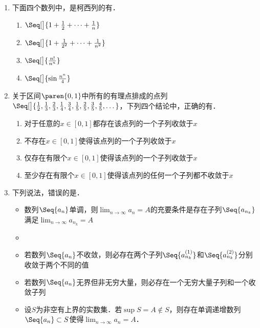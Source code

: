 \begin{enumerate}
\item 下面四个数列中，是柯西列的有\uline{}．
  \begin{enumerate}
    \renewcommand{\labelenumii}{\enumparen{\arabic{enumii}}}
  \item \(\Seq[\big]{1 + \frac12 + \dots + \frac1n}\)
  \item \(\Seq[\big]{1 + \frac1{2^2} + \dots + \frac1{n^2}}\)
  \item \(\Seq[\big]{\frac{n!}{n^n}}\)
  \item \(\Seq[\big]{\sin\frac{n^n}{4}}\)
  \end{enumerate}

\item 关于区间\(\paren{0,1}\)中所有的有理点排成的点列\(\Seq[\big]{\frac12, \frac13, \frac23, \frac14, \frac34, \frac15, \frac25, \frac35, \frac45, \dots}\)，下列四个结论中，正确的有\uline{}．
  \begin{enumerate}
    \renewcommand{\labelenumii}{\enumparen{\arabic{enumii}}}
  \item 对于任意的\(x \in [0,1]\)都存在该点列的一个子列收敛于\(x\)
  \item 不存在\(x \in [0,1]\)使得该点列的一个子列收敛于\(x\)
  \item 仅存在有限个\(x \in [0,1]\)使得该点列的一个子列收敛于\(x\)
  \item 至少存在有限个\(x \in [0,1]\)使得该点列的任何一个子列都不收敛于\(x\)
  \end{enumerate}

\item 下列说法，错误的是\uline{\makebox[6em]{}}．
  \begin{itemize}
    \renewcommand{\labelitemi}{\faCircleThin}
  \item 数列\(\Seq{a_n}\)单调，则\(\lim_{n\to\infty} a_n = A\)的充要条件是存在子列\(\Seq{a_{n_k}}\)满足\(\lim_{n\to\infty} a_{n_k} = A\)
    \ifshowsol
  \item[\faCircle]
    \else
  \item
    \fi
    若数列\(\Seq{a_n}\)不收敛，则必存在两个子列\(\Seq{a_{n_k}^{(1)}}\)和\(\Seq{a_{n_k}^{(2)}}\)分别收敛于两个不同的值
  \item 若数列\(\Seq{a_n}\)无界但非无穷大量，则必存在一个无穷大量子列和一个收敛子列
  \item 设\(S\)为非空有上界的实数集．若\(\sup S = A \notin S\)，则存在单调递增数列\(\Seq{a_n} \subset S\)使得\(\lim_{n\to\infty} a_n = A\)．
  \end{itemize}
\end{enumerate}
\fi

